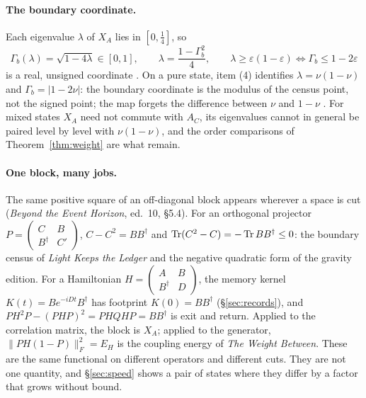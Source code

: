 \paragraph{The boundary coordinate.} Each eigenvalue $\lambda$ of $X_A$ lies in $[0,\tfrac14]$, so
\begin{equation}
\Gamma_b(\lambda)=\sqrt{1-4\lambda}\in[0,1],\qquad \lambda=\frac{1-\Gamma_b^2}{4},\qquad \lambda\ge\varepsilon(1-\varepsilon)\iff\Gamma_b\le1-2\varepsilon
\label{eq:gammab}
\end{equation}
is a real, unsigned coordinate . On a pure state, item (4) identifies $\lambda=\nu(1-\nu)$ and $\Gamma_b=|1-2\nu|$: the boundary coordinate is the modulus of the census point, not the signed point; the map forgets the difference between $\nu$ and $1-\nu$ . For mixed states $X_A$ need not commute with $A_C$, its eigenvalues cannot in general be paired level by level with $\nu(1-\nu)$, and the order comparisons of Theorem~\ref{thm:weight} are what remain.

\paragraph{One block, many jobs.} The same positive square of an off-diagonal block appears wherever a space is cut  (\emph{Beyond the Event Horizon}, ed.~10, §5.4). For an orthogonal projector $P=\begin{pmatrix}C&B\\B^\dagger&C'\end{pmatrix}$, $C-C^2=BB^\dagger$ and $\operatorname{Tr}(C^2-C)=-\operatorname{Tr} BB^\dagger\le0$: the boundary census of \emph{Light Keeps the Ledger} and the negative quadratic form of the gravity edition. For a Hamiltonian $H=\begin{pmatrix}A&B\\B^\dagger&D\end{pmatrix}$, the memory kernel $K(t)=Be^{-iDt}B^\dagger$ has footprint $K(0)=BB^\dagger$ (§\ref{sec:records}), and $PH^2P-(PHP)^2=PHQHP=BB^\dagger$ is exit and return. Applied to the correlation matrix, the block is $X_A$; applied to the generator, $\|PH(1-P)\|_F^2=E_H$ is the coupling energy of \emph{The Weight Between}. These are the same functional on different operators and different cuts. They are not one quantity, and §\ref{sec:speed} shows a pair of states where they differ by a factor that grows without bound.


